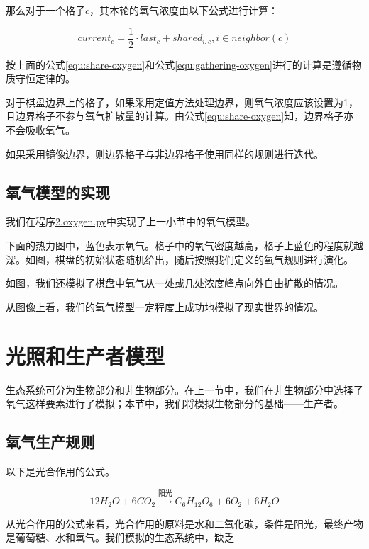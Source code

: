 \documentclass{ctexart}
\begin{document}
那么对于一个格子$c$，其本轮的氧气浓度由以下公式进行计算：

\begin{equation}
  \label{equ:gathering-oxygen}
  current_c = \frac{1}{2} \cdot last_c + shared_{i, c} , i \in neighbor(c)
\end{equation}

按上面的公式\ref{equ:share-oxygen}和公式\ref{equ:gathering-oxygen}进行的计算是遵循物质守恒定律的。

对于棋盘边界上的格子，如果采用定值方法处理边界，则氧气浓度应该设置为1，且边界格子不参与氧气扩散量的计算。由公式\ref{equ:share-oxygen}知，边界格子亦不会吸收氧气。

如果采用镜像边界，则边界格子与非边界格子使用同样的规则进行迭代。

\subsection{氧气模型的实现}

我们在程序\underline{2.oxygen.py}中实现了上一小节中的氧气模型。

下面的热力图中，蓝色表示氧气。格子中的氧气密度越高，格子上蓝色的程度就越深。如图，棋盘的初始状态随机给出，随后按照我们定义的氧气规则进行演化。

如图，我们还模拟了棋盘中氧气从一处或几处浓度峰点向外自由扩散的情况。

从图像上看，我们的氧气模型一定程度上成功地模拟了现实世界的情况。

\section{光照和生产者模型}

生态系统可分为生物部分和非生物部分。在上一节中，我们在非生物部分中选择了氧气这样要素进行了模拟；本节中，我们将模拟生物部分的基础——生产者。

\subsection{氧气生产规则}

以下是光合作用的公式。

\begin{equation}
  12H_2O + 6CO_2 \overset{阳光}{\rightarrow} C_6H_{12}O_6 + 6O_2 + 6H_2O
\end{equation}

从光合作用的公式来看，光合作用的原料是水和二氧化碳，条件是阳光，最终产物是葡萄糖、水和氧气。我们模拟的生态系统中，缺乏
\end{document}
